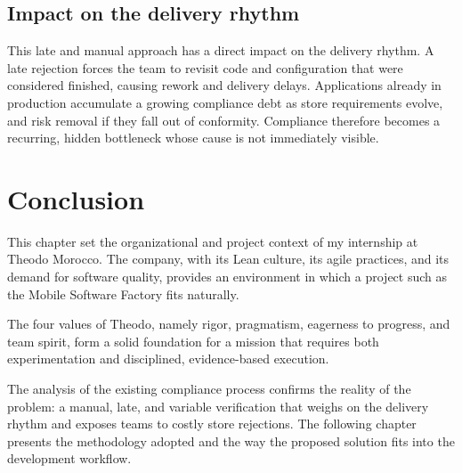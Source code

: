 \subsection{Impact on the delivery rhythm}

This late and manual approach has a direct impact on the delivery rhythm. A late rejection forces the team to revisit code and configuration that were considered finished, causing rework and delivery delays. Applications already in production accumulate a growing compliance debt as store requirements evolve, and risk removal if they fall out of conformity. Compliance therefore becomes a recurring, hidden bottleneck whose cause is not immediately visible.

\section{Conclusion}

This chapter set the organizational and project context of my internship at Theodo Morocco. The company, with its Lean culture, its agile practices, and its demand for software quality, provides an environment in which a project such as the Mobile Software Factory fits naturally.

The four values of Theodo, namely rigor, pragmatism, eagerness to progress, and team spirit, form a solid foundation for a mission that requires both experimentation and disciplined, evidence-based execution.

The analysis of the existing compliance process confirms the reality of the problem: a manual, late, and variable verification that weighs on the delivery rhythm and exposes teams to costly store rejections. The following chapter presents the methodology adopted and the way the proposed solution fits into the development workflow.

\newpage
